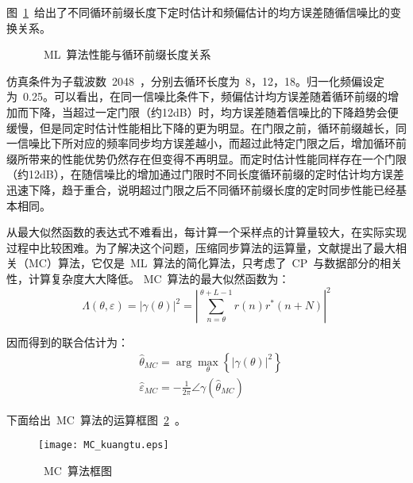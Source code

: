 图~\ref{Performance_by_CP}~给出了不同循环前缀长度下定时估计和频偏估计的均方误差随循信噪比的变换关系。
\begin{figure}[htbp]
\centering
{}
\caption{~ML~算法性能与循环前缀长度关系}\label{Performance_by_CP}
\vspace{-1em}
\end{figure}
仿真条件为子载波数~2048~，分别去循环长度为~8，12，18。归一化频偏设定为~0.25。可以看出，在同一信噪比条件下，频偏估计均方误差随着循环前缀的增加而下降，当超过一定门限（约12dB）时，均方误差随着信噪比的下降趋势会便缓慢，但是同定时估计性能相比下降的更为明显。在门限之前，循环前缀越长，同一信噪比下所对应的频率同步均方误差越小，而超过此特定门限之后，增加循环前缀所带来的性能优势仍然存在但变得不再明显。而定时估计性能同样存在一个门限（约12dB），在随信噪比的增加通过门限时不同长度循环前缀的定时估计均方误差迅速下降，趋于重合，说明超过门限之后不同循环前缀长度的定时同步性能已经基本相同。

从最大似然函数的表达式不难看出，每计算一个采样点的计算量较大，在实际实现过程中比较困难。为了解决这个问题，压缩同步算法的运算量，文献\cite{Muller1998On}提出了最大相关（MC）算法，它仅是~ML~算法的简化算法，只考虑了~CP~与数据部分的相关性，计算复杂度大大降低。
MC~算法的最大似然函数为：
\begin{equation}
\Lambda \left( {\theta ,\varepsilon } \right) = {\left| {\gamma \left( \theta  \right)} \right|^2} = {\left| {\sum\limits_{n = \theta }^{\theta  + L - 1} {r\left( n \right){r^*}\left( {n + N} \right)} } \right|^2}
\end{equation}

因而得到的联合估计为：
\begin{align}
&{{\hat \theta }_{MC}} = \arg \mathop {\max }\limits_\theta  \left\{ {{{\left| {\gamma \left( \theta  \right)} \right|}^2}} \right\} \\
&{{\hat \varepsilon }_{MC}} =  - \frac{1}{{2\pi }}\angle \gamma \left( {{{\hat \theta }_{MC}}} \right)
\end{align}

下面给出~MC~算法的运算框图~\ref{MC_kuangtu}~。
\begin{figure}[htbp]
\centering
\texttt{[image: MC\_kuangtu.eps]}
\caption{~MC~算法框图}\vspace{-1em}\label{MC_kuangtu}
\end{figure}

